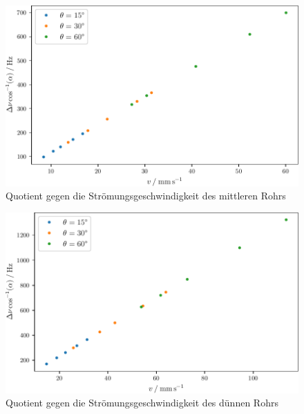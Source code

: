 \begin{figure}
    \centering
    \caption{Quotient gegen die Strömungsgeschwindigkeit des mittleren Rohrs}
    \label{fig:middle}
    \includegraphics{build/middle.pdf}
\end{figure}
\begin{figure}
    \centering
    \caption{Quotient gegen die Strömungsgeschwindigkeit des dünnen Rohrs}
    \label{fig:tiny}
    \includegraphics{build/tiny.pdf}
\end{figure}
\FloatBarrier
